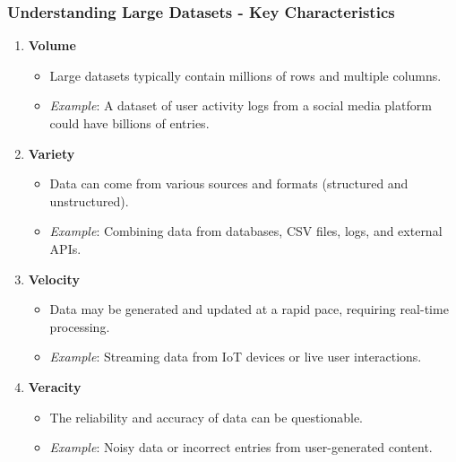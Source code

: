 \documentclass[aspectratio=169]{beamer}
\begin{document}
\begin{frame}[fragile]
    \frametitle{Understanding Large Datasets - Key Characteristics}
    \begin{enumerate}
        \item \textbf{Volume} 
            \begin{itemize}
                \item Large datasets typically contain millions of rows and multiple columns.
                \item \textit{Example}: A dataset of user activity logs from a social media platform could have billions of entries.
            \end{itemize}
        \item \textbf{Variety}
            \begin{itemize}
                \item Data can come from various sources and formats (structured and unstructured).
                \item \textit{Example}: Combining data from databases, CSV files, logs, and external APIs.
            \end{itemize}
        \item \textbf{Velocity}
            \begin{itemize}
                \item Data may be generated and updated at a rapid pace, requiring real-time processing.
                \item \textit{Example}: Streaming data from IoT devices or live user interactions.
            \end{itemize}
        \item \textbf{Veracity}
            \begin{itemize}
                \item The reliability and accuracy of data can be questionable.
                \item \textit{Example}: Noisy data or incorrect entries from user-generated content.
            \end{itemize}
    \end{enumerate}
\end{frame}
\end{document}

